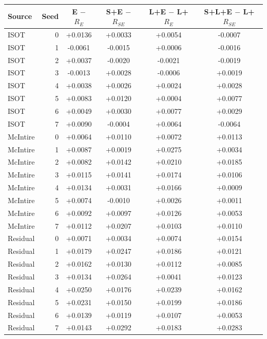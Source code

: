 \begin{tabular}{@{}lrcccc@{}}
\toprule
Source & Seed & E $-$ $R_E$ & S+E $-$ $R_{SE}$ & L+E $-$ L+$R_E$ & S+L+E $-$ L+$R_{SE}$\\
\midrule
ISOT & 0 & +0.0136 & +0.0033 & +0.0054 & -0.0007\\
ISOT & 1 & -0.0061 & -0.0015 & +0.0006 & -0.0016\\
ISOT & 2 & +0.0037 & -0.0020 & -0.0021 & -0.0019\\
ISOT & 3 & -0.0013 & +0.0028 & -0.0006 & +0.0019\\
ISOT & 4 & +0.0038 & +0.0026 & +0.0024 & +0.0028\\
ISOT & 5 & +0.0083 & +0.0120 & +0.0004 & +0.0077\\
ISOT & 6 & +0.0049 & +0.0030 & +0.0077 & +0.0029\\
ISOT & 7 & +0.0090 & -0.0004 & +0.0064 & -0.0064\\
McIntire & 0 & +0.0064 & +0.0110 & +0.0072 & +0.0113\\
McIntire & 1 & +0.0087 & +0.0019 & +0.0275 & +0.0034\\
McIntire & 2 & +0.0082 & +0.0142 & +0.0210 & +0.0185\\
McIntire & 3 & +0.0115 & +0.0141 & +0.0174 & +0.0106\\
McIntire & 4 & +0.0134 & +0.0031 & +0.0166 & +0.0009\\
McIntire & 5 & +0.0074 & -0.0010 & +0.0026 & +0.0011\\
McIntire & 6 & +0.0092 & +0.0097 & +0.0126 & +0.0053\\
McIntire & 7 & +0.0112 & +0.0207 & +0.0103 & +0.0110\\
Residual & 0 & +0.0071 & +0.0034 & +0.0074 & +0.0154\\
Residual & 1 & +0.0179 & +0.0247 & +0.0186 & +0.0121\\
Residual & 2 & +0.0162 & +0.0130 & +0.0112 & +0.0085\\
Residual & 3 & +0.0134 & +0.0264 & +0.0041 & +0.0123\\
Residual & 4 & +0.0250 & +0.0176 & +0.0239 & +0.0162\\
Residual & 5 & +0.0231 & +0.0150 & +0.0199 & +0.0186\\
Residual & 6 & +0.0139 & +0.0119 & +0.0107 & +0.0053\\
Residual & 7 & +0.0143 & +0.0292 & +0.0183 & +0.0283\\
\bottomrule
\end{tabular}
